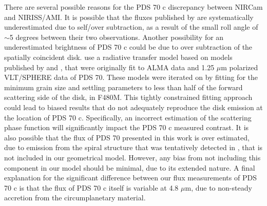 \documentclass[11pt,twocolumn,twocolappendix]{aastex631}
\newcommand{\db}[1]{\textcolor{red}{#1}}
\begin{document}

There are several possible reasons for the PDS 70 c discrepancy between NIRCam and NIRISS/AMI. It is possible that the {fluxes published by \cite{2024arXiv240304855C}} are systematically underestimated 
due to self/over subtraction, as a result of the small roll angle of $\sim$5 degrees between their two observations. Another possibility for an underestimated brightness of PDS 70 c could be due to over subtraction of the spatially coincident disk. {\cite{2024arXiv240304855C}} use a radiative transfer model based on models published by \cite{2022A&A...658A..89P} and \cite{2023A&A...677A..76P}, that were originally fit to ALMA data and 1.25 $\mu$m polarized VLT/SPHERE data of PDS 70. These models were iterated on by fitting for the minimum grain size and settling parameters to less than half of the forward scattering side of the disk, in F480M. This tightly constrained fitting approach could lead to biased results that do not adequately reproduce the disk emission at the location of PDS 70 c. Specifically, an incorrect estimation of the scattering phase function will significantly impact the PDS 70 c measured contrast. {It is also possible that the flux of PDS 70 presented in this work is over estimated, due to emission from the spiral structure that was tentatively detected in \cite{2024arXiv240304855C}, that is not included in our geometrical model. However, any bias from not including this component in our model should be minimal, due to its extended nature. A final explanation for the significant difference between our flux measurements of PDS 70 c is that the flux of PDS 70 c itself is variable at 4.8 $\mu$m, due to non-steady accretion from the circumplanetary material.}
\end{document}
